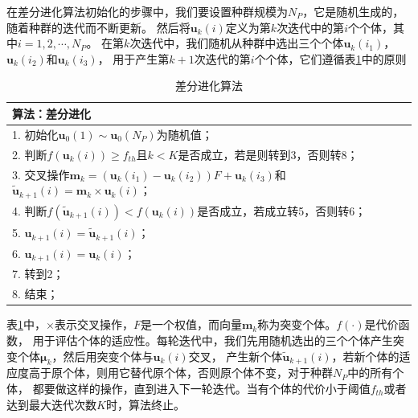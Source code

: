 \documentclass[master]{thesis-uestc}
\begin{document}
在差分进化算法初始化的步骤中，我们要设置种群规模为$N_P$，它是随机生成的，随着种群的迭代而不断更新。
然后将$\bm{u}_k(i)$定义为第$k$次迭代中的第$i$个个体，其中$i=1,2,\cdots,N_P$。
在第$k$次迭代中，我们随机从种群中选出三个个体$\bm{u}_k(i_1)$，$\bm{u}_k(i_2)$和$\bm{u}_k(i_3)$，
用于产生第$k+1$次迭代的第$i$个个体，它们遵循表\ref{de_algorithm_tab}中的原则
\begin{table}[h]
    \caption{差分进化算法}
    \begin{tabular}{l}
    \toprule
    算法：差分进化\\
    \midrule
    1. 初始化$\bm{u}_0(1)\sim\bm{u}_0(N_P)$为随机值；\\
    2. 判断$f(\bm{u}_k(i))\geqslant f_{th}$且$k<K$是否成立，若是则转到3，否则转8； \\
    3. 交叉操作$\bm{m}_k = \left(\bm{u}_k(i_1)-\bm{u}_k(i_2)\right)F + \bm{u}_k(i_3)$和
        $\tilde{\bm{u}}_{k+1}(i) = \bm{m}_k \times \bm{u}_k(i)$； \\
    4. 判断$f(\tilde{\bm{u}}_{k+1}(i)) < f(\bm{u}_k(i))$是否成立，若成立转5，否则转6； \\
    5. $\bm{u}_{k+1}(i) = \tilde{\bm{u}}_{k+1}(i)$； \\
    6. $\bm{u}_{k+1}(i) = \bm{u}_{k}(i)$； \\
    7. 转到2； \\
    8. 结束； \\
    \bottomrule
    \end{tabular}
    \label{de_algorithm_tab}
\end{table}

表\ref{de_algorithm_tab}中，$\times$表示交叉操作，$F$是一个权值，而向量$\bm{m}_k$称为突变个体。$f(\cdot)$是代价函数，
用于评估个体的适应性。每轮迭代中，我们先用随机选出的三个个体产生突变个体$\bm{\mu}_k$，然后用突变个体与$\bm{u}_k(i)$交叉，
产生新个体$\tilde{\bm{u}}_{k+1}(i)$，若新个体的适应度高于原个体，则用它替代原个体，否则原个体不变，对于种群$N_P$中的所有个体，
都要做这样的操作，直到进入下一轮迭代。当有个体的代价小于阈值$f_{th}$或者达到最大迭代次数$K$时，算法终止。
\end{document}
